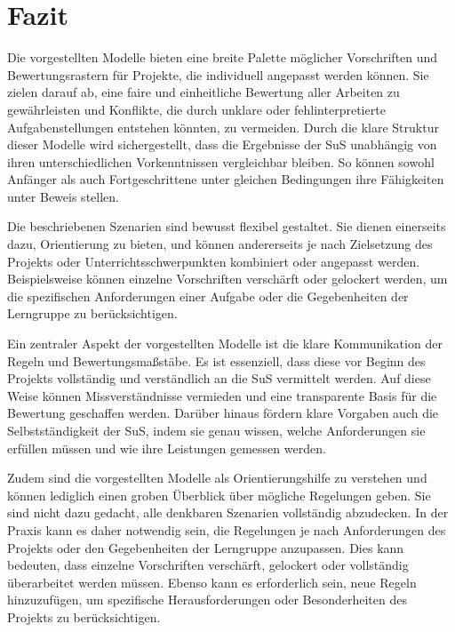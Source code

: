 \documentclass[a4paper,12pt]{article}
\begin{document}
\section{Fazit}
Die vorgestellten Modelle bieten eine breite Palette möglicher Vorschriften und Bewertungsrastern für Projekte, die individuell angepasst werden können. Sie zielen darauf ab, eine faire und einheitliche Bewertung aller Arbeiten zu gewährleisten und Konflikte, die durch unklare oder fehlinterpretierte Aufgabenstellungen entstehen könnten, zu vermeiden. Durch die klare Struktur dieser Modelle wird sichergestellt, dass die Ergebnisse der SuS unabhängig von ihren unterschiedlichen Vorkenntnissen vergleichbar bleiben. So können sowohl Anfänger als auch Fortgeschrittene unter gleichen Bedingungen ihre Fähigkeiten unter Beweis stellen.

Die beschriebenen Szenarien sind bewusst flexibel gestaltet. Sie dienen einerseits dazu, Orientierung zu bieten, und können andererseits je nach Zielsetzung des Projekts oder Unterrichtsschwerpunkten kombiniert oder angepasst werden. Beispielsweise können einzelne Vorschriften verschärft oder gelockert werden, um die spezifischen Anforderungen einer Aufgabe oder die Gegebenheiten der Lerngruppe zu berücksichtigen.

Ein zentraler Aspekt der vorgestellten Modelle ist die klare Kommunikation der Regeln und Bewertungsmaßstäbe. Es ist essenziell, dass diese vor Beginn des Projekts vollständig und verständlich an die SuS vermittelt werden. Auf diese Weise können Missverständnisse vermieden und eine transparente Basis für die Bewertung geschaffen werden. Darüber hinaus fördern klare Vorgaben auch die Selbstständigkeit der SuS, indem sie genau wissen, welche Anforderungen sie erfüllen müssen und wie ihre Leistungen gemessen werden.

Zudem sind die vorgestellten Modelle als Orientierungshilfe zu verstehen und können lediglich einen groben Überblick über mögliche Regelungen geben. Sie sind nicht dazu gedacht, alle denkbaren Szenarien vollständig abzudecken. In der Praxis kann es daher notwendig sein, die Regelungen je nach Anforderungen des Projekts oder den Gegebenheiten der Lerngruppe anzupassen. Dies kann bedeuten, dass einzelne Vorschriften verschärft, gelockert oder vollständig überarbeitet werden müssen. Ebenso kann es erforderlich sein, neue Regeln hinzuzufügen, um spezifische Herausforderungen oder Besonderheiten des Projekts zu berücksichtigen.\\
\\
\end{document}
